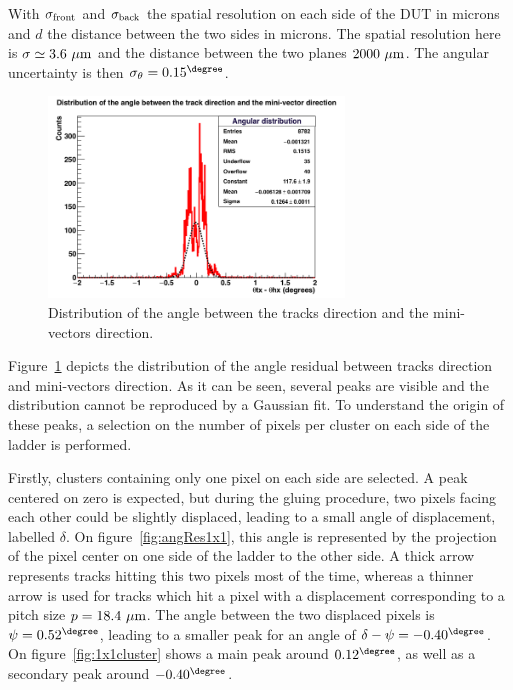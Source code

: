   With $\sigma_{\rm{front}}$ and $\sigma_{\rm{back}}$ the spatial resolution on each side of the \gls{DUT} in microns and $d$ the distance between the two sides in microns.
   The spatial resolution here is $\sigma \simeq 3.6~\rm{\mu m}$ and the distance between the two planes $2000~\rm{\mu m}$.
   The angular uncertainty is then $\sigma_{\theta} = 0.15^{\degree}$.  
   
   \begin{figure}[!h]
     \centering
     \includegraphics[width = 0.7\textwidth]{Pictures/deformation/hDiffAngleX_226056.png}
     \caption{Distribution of the angle between the tracks direction and the mini-vectors direction.}
     \label{fig:angRes}
   \end{figure}

   Figure~\ref{fig:angRes} depicts the distribution of the angle residual between tracks direction and mini-vectors direction.
   As it can be seen, several peaks are visible and the distribution cannot be reproduced by a Gaussian fit.
   To understand the origin of these peaks, a selection on the number of pixels per cluster on each side of the ladder is performed.
   
   Firstly, clusters containing only one pixel on each side are selected.
   A peak centered on zero is expected, but during the gluing procedure, two pixels facing each other could be slightly displaced, leading to a small angle of displacement, labelled $\delta$.
   On figure~\ref{fig:angRes1x1}, this angle is represented by the projection of the pixel center on one side of the ladder to the other side.
   A thick arrow represents tracks hitting this two pixels most of the time, whereas a thinner arrow is used for tracks which hit a pixel with a displacement corresponding to a pitch size $p = 18.4~\rm{\mu m}$.
   The angle between the two displaced pixels is $\psi = 0.52^{\degree}$, leading to a smaller peak for an angle of $\delta - \psi = -0.40^{\degree}$.
   On figure~\ref{fig:1x1cluster} shows a main peak around $0.12^{\degree}$, as well as a secondary peak around $-0.40^{\degree}$.

